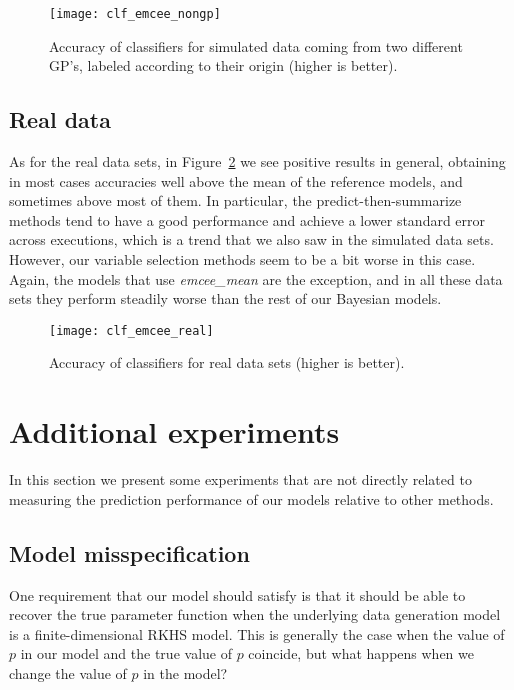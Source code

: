 \begin{figure}[htbp!]
  \centering
  \texttt{[image: clf\_emcee\_nongp]}
  \caption{Accuracy of classifiers for simulated data coming from two different GP's, labeled according to their origin (higher is better).}\label{fig:clf_emcee_nongp}
\end{figure}

\subsection*{Real data}

As for the real data sets, in Figure~\ref{fig:clf_emcee_real} we see positive results in general, obtaining in most cases accuracies well above the mean of the reference models, and sometimes above most of them. In particular, the predict-then-summarize methods tend to have a good performance and achieve a lower standard error across executions, which is a trend that we also saw in the simulated data sets. However, our variable selection methods seem to be a bit worse in this case. Again, the models that use \textit{emcee\_mean} are the exception, and in all these data sets they perform steadily worse than the rest of our Bayesian models.

\begin{figure}[ht!]
  \centering
  \texttt{[image: clf\_emcee\_real]}
  \caption{Accuracy of classifiers for real data sets (higher is better).}\label{fig:clf_emcee_real}
\end{figure}


\section{Additional experiments}

In this section we present some experiments that are not directly related to measuring the prediction performance of our models relative to other methods.

\subsection*{Model misspecification}

One requirement that our model should satisfy is that it should be able to recover the true parameter function when the underlying data generation model is a finite-dimensional RKHS model. This is generally the case when the value of \(p\) in our model and the true value of \(p\) coincide, but what happens when we change the value of \(p\) in the model?

